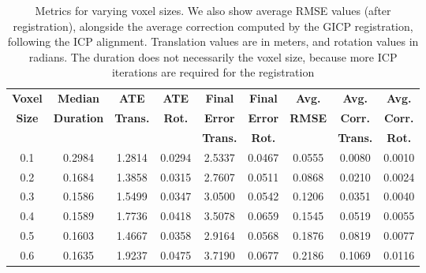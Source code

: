\begin{table}[h]
    \centering
    \begin{tabular}{c|cccccccc}
        \hline
        \textbf{Voxel} & \textbf{Median}   & \textbf{ATE}    & \textbf{ATE}  & \textbf{Final } & \textbf{Final} & \textbf{Avg.} & \textbf{Avg.}   & \textbf{Avg.}  \\
        \textbf{Size}  & \textbf{Duration} & \textbf{Trans.} & \textbf{Rot.} & \textbf{Error}  & \textbf{Error} & \textbf{RMSE} & \textbf{Corr.}  & \textbf{Corr.} \\
                       &                   & \textbf{}       & \textbf{}     & \textbf{Trans.} & \textbf{Rot.}  & \textbf{}     & \textbf{Trans.} & \textbf{Rot.}  \\
        \hline
        \hline
        0.1            & 0.2984            & 1.2814          & 0.0294        & 2.5337          & 0.0467         & 0.0555        & 0.0080          & 0.0010         \\
        0.2            & 0.1684            & 1.3858          & 0.0315        & 2.7607          & 0.0511         & 0.0868        & 0.0210          & 0.0024         \\
        0.3            & 0.1586            & 1.5499          & 0.0347        & 3.0500          & 0.0542         & 0.1206        & 0.0351          & 0.0040         \\
        0.4            & 0.1589            & 1.7736          & 0.0418        & 3.5078          & 0.0659         & 0.1545        & 0.0519          & 0.0055         \\
        0.5            & 0.1603            & 1.4667          & 0.0358        & 2.9164          & 0.0568         & 0.1876        & 0.0819          & 0.0077         \\
        0.6            & 0.1635            & 1.9237          & 0.0475        & 3.7190          & 0.0677         & 0.2186        & 0.1069          & 0.0116         \\
        \hline
    \end{tabular}
    \caption{Metrics for varying voxel sizes. We also show average RMSE values (after registration), alongside the average correction computed by the GICP registration, following the ICP alignment. Translation values are in meters, and rotation values in radians. The duration does not necessarily the voxel size, because more ICP iterations are required for the registration}
    \label{tab:voxel_metrics}
\end{table}

